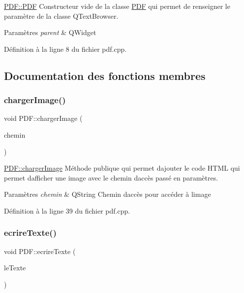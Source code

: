 \hyperlink{class_p_d_f_af73fdd2d9d2d8aad204895ff5ffd35c4}{P\+D\+F\+::\+P\+DF} Constructeur vide de la classe \hyperlink{class_p_d_f}{P\+DF} qui permet de renseigner le paramètre de la classe Q\+Text\+Browser. 


\begin{DoxyParams}{Paramètres}
{\em parent} & Q\+Widget \\
\hline
\end{DoxyParams}


Définition à la ligne 8 du fichier pdf.\+cpp.



\subsection{Documentation des fonctions membres}
\mbox{\label{class_p_d_f_a3c7d97ad7f3c7a390272d05c7f95e832}} 
\subsubsection{\texorpdfstring{charger\+Image()}{chargerImage()}}
{\footnotesize\ttfamily void P\+D\+F\+::charger\+Image (\begin{DoxyParamCaption}\item[{Q\+String}]{chemin }\end{DoxyParamCaption})}



\hyperlink{class_p_d_f_a3c7d97ad7f3c7a390272d05c7f95e832}{P\+D\+F\+::charger\+Image} Méthode publique qui permet d\textquotesingle{}ajouter le code H\+T\+ML qui permet d\textquotesingle{}afficher une image avec le chemin d\textquotesingle{}accès passé en paramètres. 


\begin{DoxyParams}{Paramètres}
{\em chemin} & Q\+String Chemin d\textquotesingle{}accès pour accéder à l\textquotesingle{}image \\
\hline
\end{DoxyParams}


Définition à la ligne 39 du fichier pdf.\+cpp.

\mbox{\label{class_p_d_f_a7bb38923f4141702b3772ec41213917f}} 
\subsubsection{\texorpdfstring{ecrire\+Texte()}{ecrireTexte()}}
{\footnotesize\ttfamily void P\+D\+F\+::ecrire\+Texte (\begin{DoxyParamCaption}\item[{Q\+String}]{le\+Texte }\end{DoxyParamCaption})}



